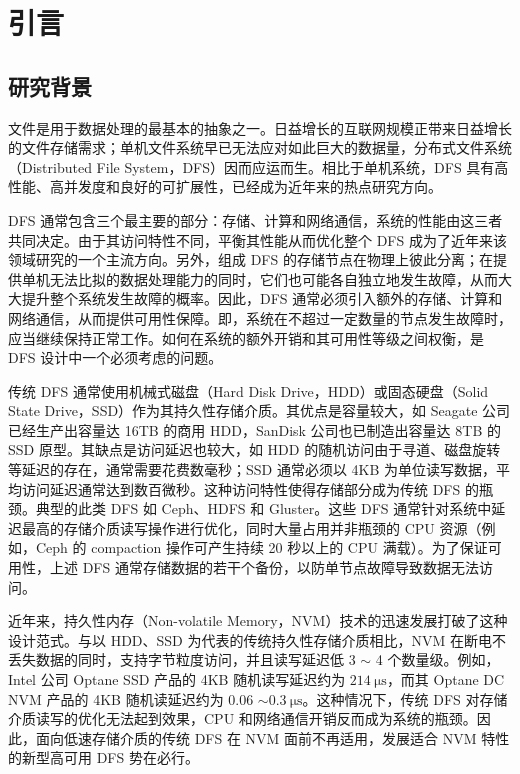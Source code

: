 
\chapter{引言}
\label{cha:intro}


\section{研究背景}
\label{sec:ch1_background}

文件是用于数据处理的最基本的抽象之一。日益增长的互联网规模正带来日益增长的文件存储需求；单机文件系统早已无法应对如此巨大的数据量，分布式文件系统（Distributed File System，DFS）因而应运而生。相比于单机系统，DFS 具有高性能、高并发度和良好的可扩展性，已经成为近年来的热点研究方向。

DFS 通常包含三个最主要的部分：存储、计算和网络通信，系统的性能由这三者共同决定。由于其访问特性不同，平衡其性能从而优化整个 DFS 成为了近年来该领域研究的一个主流方向。另外，组成 DFS 的存储节点在物理上彼此分离；在提供单机无法比拟的数据处理能力的同时，它们也可能各自独立地发生故障，从而大大提升整个系统发生故障的概率。因此，DFS 通常必须引入额外的存储、计算和网络通信，从而提供可用性保障。即，系统在不超过一定数量的节点发生故障时，应当继续保持正常工作。如何在系统的额外开销和其可用性等级之间权衡，是 DFS 设计中一个必须考虑的问题。

传统 DFS 通常使用机械式磁盘（Hard Disk Drive，HDD）或固态硬盘（Solid State Drive，SSD）作为其持久性存储介质。其优点是容量较大，如 Seagate 公司已经生产出容量达 16TB 的商用 HDD，SanDisk 公司也已制造出容量达 8TB 的 SSD 原型。其缺点是访问延迟也较大，如 HDD 的随机访问由于寻道、磁盘旋转等延迟的存在，通常需要花费数毫秒；SSD 通常必须以 4KB 为单位读写数据，平均访问延迟通常达到数百微秒。这种访问特性使得存储部分成为传统 DFS 的瓶颈。典型的此类 DFS 如 Ceph\cite{ceph2006}、HDFS\cite{hadoop2010} 和 Gluster\cite{gluster2013}。这些 DFS 通常针对系统中延迟最高的存储介质读写操作进行优化，同时大量占用并非瓶颈的 CPU 资源（例如，Ceph 的 compaction 操作可产生持续 20 秒以上的 CPU 满载\cite{assise2019}）。为了保证可用性，上述 DFS 通常存储数据的若干个备份，以防单节点故障导致数据无法访问。

近年来，持久性内存（Non-volatile Memory，NVM）技术的迅速发展打破了这种设计范式。与以 HDD、SSD 为代表的传统持久性存储介质相比，NVM 在断电不丢失数据的同时，支持字节粒度访问，并且读写延迟低 3 $\sim$ 4 个数量级。例如，Intel 公司 Optane\textsuperscript{\texttrademark} SSD 产品的 4KB 随机读写延迟约为 $\SI{214}{\us}$\cite{optanessd}，而其 Optane\textsuperscript{\texttrademark} DC NVM 产品的 4KB 随机读延迟约为 0.06 $\sim \SI{0.3}{\us}$\cite{yangnvm2020}。这种情况下，传统 DFS 对存储介质读写的优化无法起到效果，CPU 和网络通信开销反而成为系统的瓶颈。因此，面向低速存储介质的传统 DFS 在 NVM 面前不再适用，发展适合 NVM 特性的新型高可用 DFS 势在必行。

